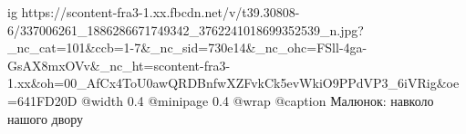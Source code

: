  
 
 
 
 

\ifcmt
  ig https://scontent-fra3-1.xx.fbcdn.net/v/t39.30808-6/337006261_1886286671749342_3762241018699352539_n.jpg?_nc_cat=101&ccb=1-7&_nc_sid=730e14&_nc_ohc=FSll-4ga-GsAX8mxOVv&_nc_ht=scontent-fra3-1.xx&oh=00_AfCx4ToU0awQRDBnfwXZFvkCk5evWkiO9PPdVP3_6iVRig&oe=641FD20D
  @width 0.4
  @minipage 0.4
  @wrap \parpic[r]
	@caption Малюнок: навколо нашого двору
\fi
